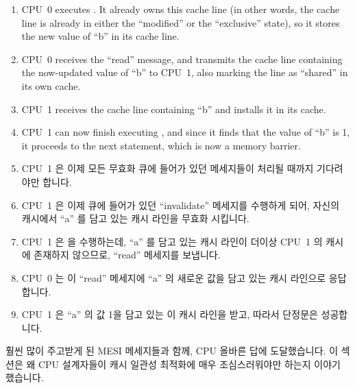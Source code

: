 \begin{enumerate}
\item	CPU~0 executes .
	It already owns this cache line (in other words, the cache line
	is already in either the ``modified'' or the ``exclusive'' state),
	so it stores the new value of ``b'' in its cache line.
\item	CPU~0 receives the ``read'' message, and transmits the
	cache line containing the now-updated value of ``b''
	to CPU~1, also marking the line as ``shared'' in its own cache.
\item	CPU~1 receives the cache line containing ``b'' and installs
	it in its cache.
\item	CPU~1 can now finish executing ,
	and since it finds that the value of ``b'' is 1, it proceeds
	to the next statement, which is now a memory barrier.
\fi
\item	CPU~1 은 이제 모든 무효화 큐에 들어가 있던 메세지들이 처리될 때까지
	기다려야만 합니다.
\item	CPU~1 은 이제 큐에 들어가 있던 ``invalidate'' 메세지를 수행하게 되어,
	자신의 캐시에서 ``a'' 를 담고 있는 캐시 라인을 무효화 시킵니다.
\item	CPU~1 은  을 수행하는데, ``a'' 를 담고 있는 캐시
	라인이 더이상 CPU~1 의 캐시에 존재하지 않으므로, ``read'' 메세지를
	보냅니다.
\item	CPU~0 는 이 ``read'' 메세지에 ``a'' 의 새로운 값을 담고 있는 캐시
	라인으로 응답합니다.
\item	CPU~1 은 ``a'' 의 값 1을 담고 있는 이 캐시 라인을 받고, 따라서 단정문은
	성공합니다.

\end{enumerate}

훨씬 많이 주고받게 된 MESI 메세지들과 함께, CPU 올바른 답에 도달했습니다.
이 섹션은 왜 CPU 설계자들이 캐시 일관성 최적화에 매우 조심스러워야만 하는지
이야기 했습니다.
\iffalse

